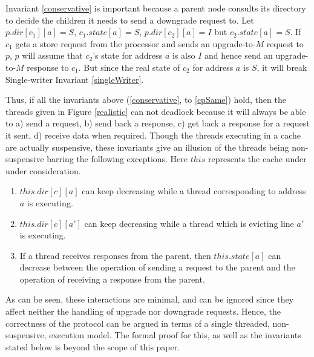 Invariant \ref{conservative} is important because a parent node consults its
directory to decide the children it needs to send a downgrade request to.  Let
$p.dir[c_1][a] = S$, $c_1.state[a] = S$, $p.dir[c_2][a] = I$ but
$c_2.state[a] = S$. If $c_1$ gets a store request from the processor and sends
an upgrade-to-$M$ request to $p$, $p$ will assume that $c_2$'s state for address $a$
is also $I$ and hence send an upgrade-to-$M$ response to $c_1$. But since the real
state of  $c_2$ for address $a$ is $S$, it will break Single-writer Invariant
\ref{singleWriter}.

Thus, if all the invariants above (\ref{conservative}, to \ref{cpSame}) hold,
then the threads given in Figure \ref{realistic} can not deadlock because it
will always be able to a) send a request, b) send back a response, c) get back
a response for a request it sent, d) receive data when required. Though the
threads executing in a cache are actually suspensive, these invariants give an
illusion of the threads being non-suspensive barring the following exceptions.
Here $this$ represents the cache under under consideration.

\begin{enumerate}
\item $this.dir[c][a]$ can keep decreasing while a thread corresponding to
address $a$ is executing.
\item $this.dir[c][a']$ can keep decreasing while a thread which is evicting
line $a'$ is executing.
\item If a thread receives responses from the parent, then $this.state[a]$ can
decrease between the operation of sending a request to the parent and the
operation of receiving a response from the parent.
\end{enumerate}

As can be seen, these interactions are minimal, and can be ignored since they
affect neither the handling of upgrade nor downgrade requests. Hence, the
correctness of the protocol can be argued in terms of a single threaded,
non-suspensive, execution model. The formal proof for this, as well as the
invariants stated below is beyond the scope of this paper.


